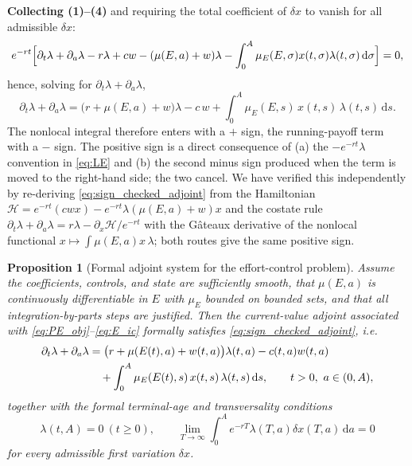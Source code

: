 \documentclass[pdflatex,sn-mathphys-num]{sn-jnl}
\newtheorem{proposition}[theorem]{Proposition}
\theoremstyle{definition}
\theoremstyle{remark}
\newcommand{\dd}{\,\mathrm{d}}
\begin{document}
\smallskip
\noindent\textbf{Collecting (1)--(4)} and requiring the total coefficient of
$\delta x$ to vanish for all admissible $\delta x$:
\[
e^{-rt}\Bigl[
\partial_t\lambda+\partial_a\lambda-r\lambda
+cw-(\mu(E,a)+w)\lambda
-\int_0^A\mu_E(E,\sigma)x(t,\sigma)\lambda(t,\sigma)\dd\sigma
\Bigr]=0,
\]
hence, solving for $\partial_t\lambda+\partial_a\lambda$,
\begin{equation}\label{eq:sign_checked_adjoint}
\partial_t\lambda+\partial_a\lambda
=\bigl(r+\mu(E,a)+w\bigr)\lambda-c\,w
+\int_0^A\mu_E(E,s)\,x(t,s)\,\lambda(t,s)\dd s.
\end{equation}
The nonlocal integral therefore enters with a $\boldsymbol{+}$ sign, the
running-payoff term with a $\boldsymbol{-}$ sign. The positive sign is a
direct consequence of (a) the $-e^{-rt}\lambda$ convention in \eqref{eq:LE}
and (b) the second minus sign produced when the term is moved to the
right-hand side; the two cancel. We have verified this independently by
re-deriving \eqref{eq:sign_checked_adjoint} from the Hamiltonian
$\mathcal H=e^{-rt}(cwx)-e^{-rt}\lambda(\mu(E,a)+w)x$ and the costate rule
$\partial_t\lambda+\partial_a\lambda=r\lambda-\partial_x\mathcal H/e^{-rt}$
with the G\^ateaux derivative of the nonlocal functional
$x\mapsto\int\mu(E,a)x\,\lambda$; both routes give the same positive sign.

\begin{proposition}[Formal adjoint system for the effort-control problem]
\label{prop:formal_effort_adjoint}
Assume the coefficients, controls, and state are sufficiently smooth, that
$\mu(E,a)$ is continuously differentiable in $E$ with $\mu_E$ bounded on
bounded sets, and that all integration-by-parts steps are justified. Then the
current-value adjoint associated with \eqref{eq:PE_obj}--\eqref{eq:E_ic}
formally satisfies \eqref{eq:sign_checked_adjoint}, i.e.
\begin{align}
\partial_t\lambda+\partial_a\lambda
&=\bigl(r+\mu(E(t),a)+w(t,a)\bigr)\lambda(t,a)-c(t,a)w(t,a)
\notag\\
&\quad+\int_0^A\mu_E(E(t),s)\,x(t,s)\,\lambda(t,s)\dd s,
\qquad t>0,\ a\in(0,A),
\label{eq:formal_effort_adjoint}
\end{align}
together with the formal terminal-age and transversality conditions
\begin{equation}\label{eq:formal_effort_boundary}
\lambda(t,A)=0\ (t\ge0),\qquad
\lim_{T\to\infty}\int_0^A e^{-rT}\lambda(T,a)\delta x(T,a)\dd a=0
\end{equation}
for every admissible first variation $\delta x$.
\end{proposition}
\end{document}
